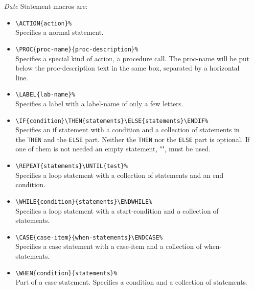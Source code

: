 \begin{namelist}{{\large\it Date}}
Statement macros are:
\begin{itemize}
\item \verb+\ACTION{action}%+\\
Specifies a normal statement.
\item \verb+\PROC{proc-name}{proc-description}%+\\
Specifies a
special kind of action, a procedure call. The proc-name will be
put below the proc-description text in the same box, separated
by a horizontal line.
\item \verb+\LABEL{lab-name}%+\\
Specifies a label with a
label-name of only a few letters.
\item \verb+\IF{condition}\THEN{statements}\ELSE{statements}\ENDIF%+\\
Specifies an if statement
with a condition and a collection of statements in the {\tt THEN} and
the {\tt ELSE} part.
Neither the {\tt THEN} nor the {\tt ELSE} part is optional. If
one of them is not needed an empty statement, "{}", must be used.
\item \verb+\REPEAT{statements}\UNTIL{test}%+\\
Specifies a loop statement
with a collection of statements and an end condition.
\item \verb+\WHILE{condition}{statements}\ENDWHILE%+\\
Specifies a loop statement
with a start-condition and a collection of statements.
\item \verb+\CASE{case-item}{when-statements}\ENDCASE%+\\
Specifies a case statement
with a case-item and a collection of when-statements.
\item \verb+\WHEN{condition}{statements}%+\\
Part of a case statement.
Specifies a condition and a collection of statements.
\end{itemize}


\end{namelist}
